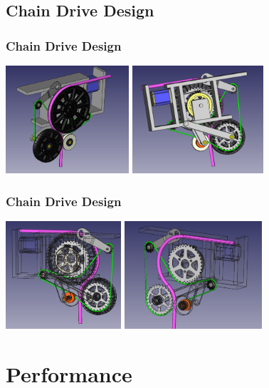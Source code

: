 \documentclass{beamer}
\begin{document}
\subsection{Chain Drive Design}
\begin{frame}
\frametitle{Chain Drive Design}
\centering\includegraphics[height=4cm]{final1}
\centering\includegraphics[height=4cm]{final2}
\end{frame}
\begin{frame}
\frametitle{Chain Drive Design}
\centering\includegraphics[height=4cm]{final3}
\centering\includegraphics[height=4cm]{final4}
\end{frame}


\section{Performance}
\end{document}
